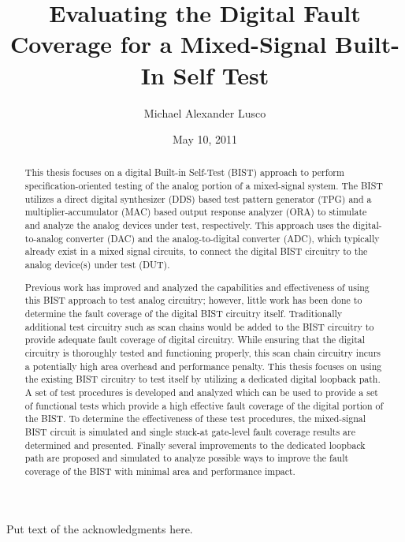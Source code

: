 \documentclass[12pt]{report}
\title{Evaluating the Digital Fault Coverage for a Mixed-Signal Built-In Self Test}
\author{Michael Alexander Lusco}
\date{May 10, 2011} %
\begin{document}
\begin{romanpages}      %

\TitlePage 

\begin{abstract}
This thesis focuses on a digital Built-in Self-Test (BIST) approach to perform specification-oriented testing of the analog portion of a mixed-signal system.  The BIST utilizes a direct digital synthesizer (DDS) based test pattern generator (TPG) and a multiplier-accumulator (MAC) based output response analyzer (ORA) to stimulate and analyze the analog devices under test, respectively.  This approach uses the digital-to-analog converter (DAC) and the analog-to-digital converter (ADC), which typically already exist in a mixed signal circuits, to connect the digital BIST circuitry to the analog device(s) under test (DUT).

Previous work has improved and analyzed the capabilities and effectiveness of using this BIST approach to test analog circuitry; however, little work has been done to determine the fault coverage of the digital BIST circuitry itself.  Traditionally additional test circuitry such as scan chains would be added to the BIST circuitry to provide adequate fault coverage of digital circuitry.  While ensuring that the digital circuitry is thoroughly tested and functioning properly, this scan chain circuitry incurs a potentially high area overhead and performance penalty.  This thesis focuses on using the existing BIST circuitry to test itself by utilizing a dedicated digital loopback path.  A set of test procedures is developed and analyzed which can be used to provide a set of functional tests which provide a high effective fault coverage of the digital portion of the BIST.  To determine the effectiveness of these test procedures, the mixed-signal BIST circuit is simulated and single stuck-at gate-level fault coverage results are determined and presented.  Finally several improvements to the dedicated loopback path are proposed and simulated to analyze possible ways to improve the fault coverage of the BIST with minimal area and performance impact.
\end{abstract}

\begin{acknowledgments}
Put text of the acknowledgments here.
\end{acknowledgments}

\tableofcontents
\listoffigures
\listoftables

\printnomenclature[0.5in] %
\end{romanpages}        %
\end{document}
